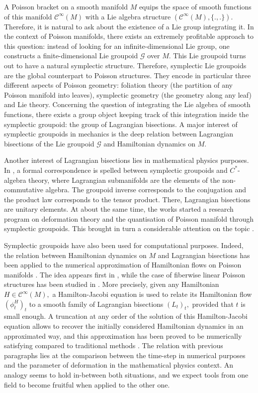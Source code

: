 \documentclass[a4paper,11pt]{article}
\newcommand{\func}[1]{\mathcal{C}^{\infty}(#1)}
\begin{document}
A Poisson bracket on a smooth manifold $M$ equips the space of smooth functions of this manifold $\func{M}$ with a Lie algebra structure $(\func{M}, \{.,.\})$. Therefore, it is natural to ask about the existence of a Lie group integrating it. In the context of Poisson manifolds, there exists an extremely profitable approach to this question: instead of looking for an infinite-dimensional Lie group, one constructs a finite-dimensional Lie groupoid $\mathcal{G}$ over $M$. This Lie groupoid turns out to have a natural symplectic structure. Therefore, symplectic Lie groupoids are the global counterpart to Poisson structures. They encode in particular three different aspects of Poisson geometry: foliation theory (the partition of any Poisson manifold into leaves), symplectic geometry (the geometry along any leaf) and Lie theory. Concerning the question of integrating the Lie algebra of smooth functions, there exists a group object keeping track of this integration inside the symplectic groupoid: the group of Lagrangian bisections. A major interest of symplectic groupoids in mechanics is the deep relation between Lagrangian bisections of the Lie groupoid $\mathcal{G}$ and Hamiltonian dynamics on $M.$

Another interest of Lagrangian bisections lies in mathematical physics purposes. In \cite{Weinstein1987}, a formal correspondence is spelled between symplectic groupoids and $C^{*}$-algebra theory, where Lagrangian submanifolds are the elements of the non-commutative algebra. The groupoid inverse corresponds to the conjugation and the product law corresponds to the tensor product. There, Lagrangian bisections are unitary elements. At about the same time, the works \cite{Karasev1987, zakrzewski1990} started a research program on deformation theory and the quantisation of Poisson manifold through symplectic groupoids. This brought in turn a considerable attention on the topic \cite{weinstein1991, dSW, karabegov2005, hawkins2008}.

Symplectic groupoids have also been used for computational purposes. Indeed, the relation between Hamiltonian dynamics on $M$ and Lagrangian bisections has been applied to the numerical approximation of Hamiltonian flows on Poisson manifolds \cite{oscar}. The idea appears first in \cite{Ge1990}, while the case of fiberwise linear Poisson structures has been studied in \cite{deLeon2017}.  More precisely, given any Hamiltonian $H \in \func{M},$ a Hamilton-Jacobi equation is used to relate its Hamiltonian flow $(\phi_t^H)_t$ to a smooth family of Lagrangian bisections $(L_t)_t,$ provided that $t$ is small enough. A truncation at any order of the solution of this Hamilton-Jacobi equation allows to recover the initially considered Hamiltonian dynamics in an approximated way, and this approximation has been proved to be numerically satisfying compared to traditional methods \cite{Oscar2022}. The relation with previous paragraphs lies at the comparison between the time-step in numerical purposes and the parameter of deformation in the mathematical physics context. An analogy seems to hold in-between both situations, and we expect tools from one field to become fruitful when applied to the other one.
\end{document}
